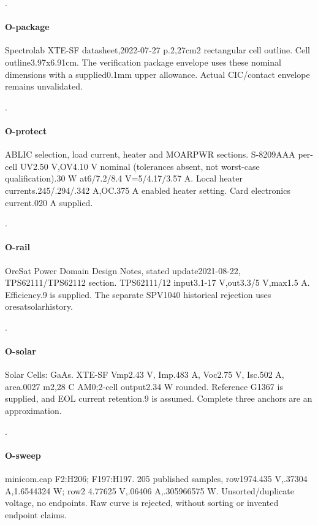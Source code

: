 \citep{greenberg2021oresat}.

\paragraph{O-package} Spectrolab XTE-SF datasheet,\allowbreak{}2022-07-27 p.2,\allowbreak{}27cm2 rectangular cell outline. Cell outline3.97x6.91cm. The verification package envelope uses these nominal dimensions with a supplied0.1mm upper allowance. Actual CIC/contact envelope remains unvalidated.

\citep{cots-solar_src_spectro_xtesf}.

\paragraph{O-protect} ABLIC selection,\allowbreak{} load current,\allowbreak{} heater and MOARPWR sections. S-8209AAA per-cell UV2.50 V,\allowbreak{}OV4.10 V nominal (tolerances absent,\allowbreak{} not worst-case qualification).30 W at6/7.2/8.4 V=5/4.17/3.57 A. Local heater currents.245/.294/.342 A,\allowbreak{}OC.375 A enabled heater setting. Card electronics current.020 A supplied.

\citep{oresat2025batterydesign}.

\paragraph{O-rail} OreSat Power Domain Design Notes,\allowbreak{} stated update2021-08-22,\allowbreak{} TPS62111/TPS62112 section. TPS62111/12 input3.1-17 V,\allowbreak{}out3.3/5 V,\allowbreak{}max1.5 A. Efficiency.9 is supplied. The separate SPV1040 historical rejection uses oresatsolarhistory.

\citep{oresat2021opddesign}.

\paragraph{O-solar} Solar Cells: GaAs. XTE-SF Vmp2.43 V,\allowbreak{} Imp.483 A,\allowbreak{} Voc2.75 V,\allowbreak{} Isc.502 A,\allowbreak{} area.0027 m2,\allowbreak{}28 C AM0;2-cell output2.34 W rounded. Reference G1367 is supplied,\allowbreak{} and EOL current retention.9 is assumed. Complete three anchors are an approximation.

\citep{oresat2025solardesign}.

\paragraph{O-sweep} minicom.cap F2:H206; F197:H197. 205 published samples,\allowbreak{} row1974.435 V,\allowbreak{}.37304 A,\allowbreak{}1.6544324 W; row2 4.77625 V,\allowbreak{}.06406 A,\allowbreak{}.305966575 W. Unsorted/duplicate voltage,\allowbreak{} no endpoints. Raw curve is rejected,\allowbreak{} without sorting or invented endpoint claims.

